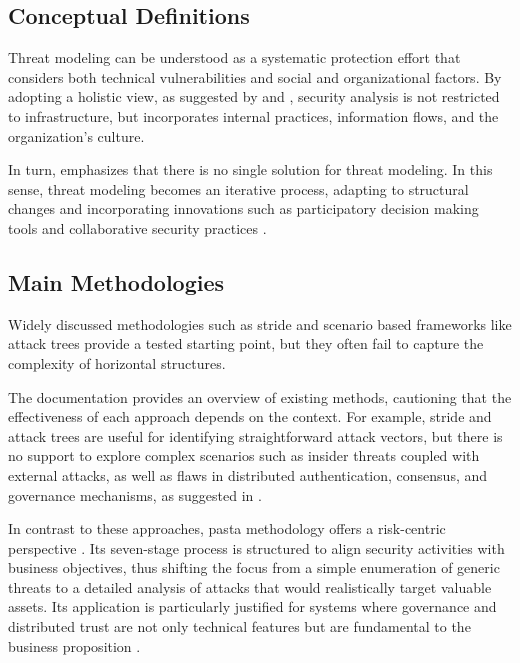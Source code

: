 \subsection{Conceptual Definitions}
\label{subsec:conceptual_definitions}

Threat modeling can be understood as a systematic protection effort that
considers both technical vulnerabilities and social and organizational factors.
By adopting a holistic view, as suggested by
\cite{ThreatModelingAsABasisForSecurityRequirements} and
\cite{AdvancedThreatModeling}, security analysis is not restricted to
infrastructure, but incorporates internal practices, information flows, and the
organization's culture.

In turn, \cite{DemystifyingTheThreatModelingProcess} emphasizes that there is no
single solution for threat modeling. In this sense, threat modeling becomes an
iterative process, adapting to structural changes and incorporating innovations
such as participatory decision making tools and collaborative security practices
\cite{ParticipatoryThreatModelling}.

\subsection{Main Methodologies}
\label{subsec:main_methodologies}

Widely discussed methodologies such as \gls{stride} and
scenario based frameworks like attack trees \cite{EvaluationofCompetingThreatModeling}
provide a tested starting point, but they often fail to capture the complexity of
horizontal structures.

The documentation \cite{ThreatModelingASummaryOfAvailableMethods} provides an
overview of existing methods, cautioning that the effectiveness of each approach
depends on the context. For example, \gls{stride} and attack trees are useful
for identifying straightforward attack vectors, but there is no support
to explore complex scenarios such as insider
threats coupled with external attacks, as well as flaws in distributed
authentication, consensus, and governance mechanisms, as suggested in
\cite{STRIDEthreatmodelingforcyberphysical}.

In contrast to these approaches, \gls{pasta} methodology offers a 
risk-centric perspective \cite{RiskCentricThreatModeling}. Its seven-stage process is
structured to align security activities with business objectives,
thus shifting the focus from a simple enumeration of generic threats to a
detailed analysis of attacks that would realistically target valuable assets.
Its application is particularly justified for systems where governance and distributed trust are
not only technical features but are fundamental to the business proposition \cite{RiskCentricThreatModeling}.

